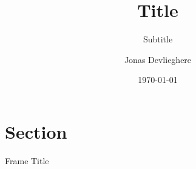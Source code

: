 \documentclass[t]{beamer}
\title{Title}
\subtitle{Subtitle}
\author{Jonas Devlieghere}
\institute{KU Leuven}
\date{\today}
\begin{document}
\frame{\titlepage} 

\section{Section} 
\begin{frame}{Frame Title} 
\end{frame}
\end{document}
